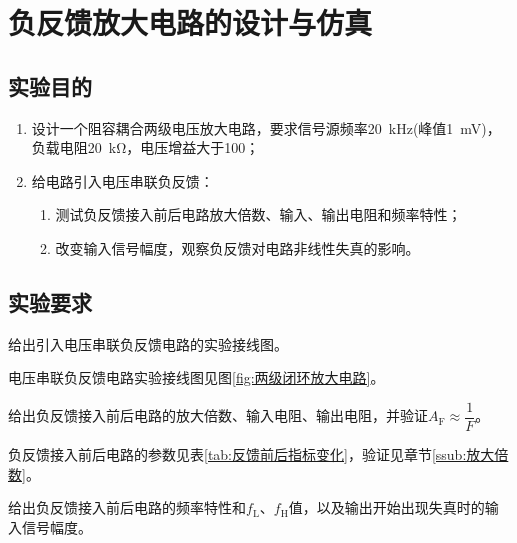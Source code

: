 \chapter{负反馈放大电路的设计与仿真}%
\label{cha:负反馈放大电路的设计与仿真}

\section{实验目的}%
\label{sec:\arabic{chapter}实验目的}

\begin{enumerate}
	\item 设计一个阻容耦合两级电压放大电路，要求信号源频率\SI{20}{\kHz}(峰值\SI{1}{\mV})，负载电阻\SI{20}{\kohm}，电压增益大于100；
	\item 给电路引入电压串联负反馈：
		\begin{enumerate}
			\item 测试负反馈接入前后电路放大倍数、输入、输出电阻和频率特性；
			\item 改变输入信号幅度，观察负反馈对电路非线性失真的影响。
		\end{enumerate}
\end{enumerate}

\section{实验要求}%
\label{sec:\arabic{chapter}实验要求}

\begin{Exercise}
	给出引入电压串联负反馈电路的实验接线图。
\end{Exercise}

\begin{Answer}
	电压串联负反馈电路实验接线图见图\ref{fig:两级闭环放大电路}。
\end{Answer}

\begin{Exercise}
	给出负反馈接入前后电路的放大倍数、输入电阻、输出电阻，并验证$ A_\mathrm{F}\approx\dfrac{1}{F} $。
\end{Exercise}

\begin{Answer}
	负反馈接入前后电路的参数见表\ref{tab:反馈前后指标变化}，验证见章节\ref{ssub:放大倍数}。
\end{Answer}

\begin{Exercise}
	给出负反馈接入前后电路的频率特性和$ f_\mathrm{L} $、$ f_\mathrm{H} $值，以及输出开始出现失真时的输入信号幅度。
\end{Exercise}

